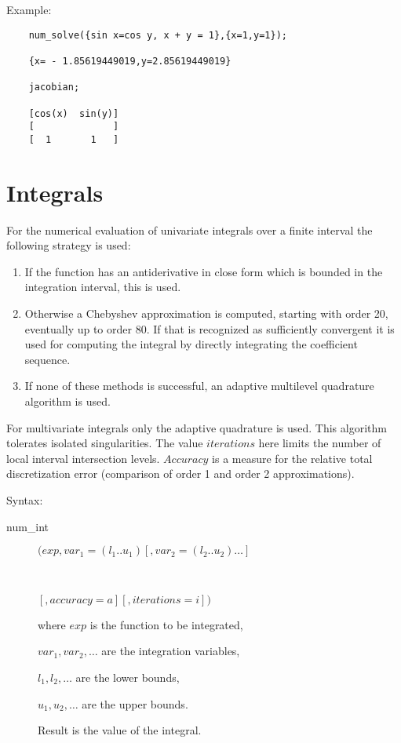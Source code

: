 Example:
\begin{verbatim}
    num_solve({sin x=cos y, x + y = 1},{x=1,y=1});

    {x= - 1.85619449019,y=2.85619449019}

    jacobian;

    [cos(x)  sin(y)]
    [              ]
    [  1       1   ]
\end{verbatim}

\section{Integrals}
\hypertarget{operator:NUM_INT}{}

For the numerical evaluation of univariate integrals over a finite
interval the following strategy is used:
\begin{enumerate}
\item If the function has an antiderivative in close form
    which is bounded in the integration interval, this
    is used.
\item Otherwise a Chebyshev approximation is computed,
    starting with order 20, eventually up to order 80.
    If that is recognized as sufficiently convergent
    it is used for computing the integral by directly
    integrating the coefficient sequence.
\item If none of these methods is successful, an
    adaptive multilevel quadrature algorithm is used.
\end{enumerate}
For multivariate integrals only the adaptive quadrature is used.
This algorithm tolerates isolated singularities.
The value $iterations$ here limits the number of
local interval intersection levels.
$Accuracy$ is a measure for the relative total discretization
error (comparison of order 1 and order 2 approximations).

Syntax:

\begin{description}
\item[num\_int] $(exp,var_1=(l_1 .. u_1)[,var_2=(l_2 .. u_2)\ldots]$
\item[\ \ \ \ \ \ ]$[,accuracy=a][,iterations=i])$

where $exp$ is the function to be integrated,

$var_1, var_2 , \ldots$ are the integration variables,

$l_1, l_2 , \ldots$ are the lower bounds,

$u_1, u_2 , \ldots$ are the upper bounds.

Result is the value of the integral.

\end{description}

